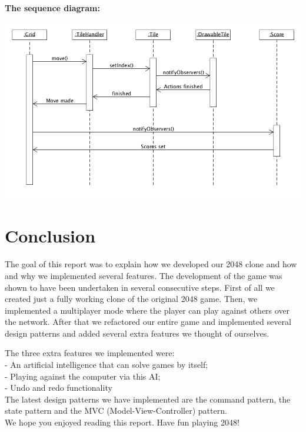 \documentclass[a4paper,11pt,report]{scrartcl}
\begin{document}
\newpage\textbf{The sequence diagram:}\\
\centerline{\includegraphics[scale=0.7]{sources/MVCPatternsequence}}

\newpage\section{Conclusion}

The goal of this report was to explain how we developed our 2048 clone and how
and why we implemented several features. 
The development of the game was shown to have been undertaken in several consecutive steps. First of all we created just a fully working clone of the original 2048 game. Then, we implemented a multiplayer mode where the player can play against others over the network. After that we refactored our entire game and implemented several design patterns and added several extra features we thought of ourselves.

The three extra features we implemented were:\\
- An artificial intelligence that can solve games by itself;\\
- Playing against the computer via this AI;\\
- Undo and redo functionality\\

The latest design patterns we have implemented are the command pattern, the
state pattern and the MVC (Model-View-Controller) pattern.\\

We hope you enjoyed reading this report. Have fun playing 2048!\\
\end{document}
